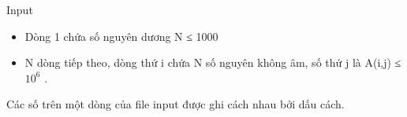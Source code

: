 Input
\begin{itemize}
	\item     Dòng 1 chứa số nguyên dương N ≤ 1000   
	\item     N dòng tiếp theo, dòng thứ i chứa N số nguyên không âm, số thứ j là A(i,j)         ≤ $10^{6}$     .    
\end{itemize}

   Các số trên một dòng của file input được ghi cách nhau bởi dấu cách.